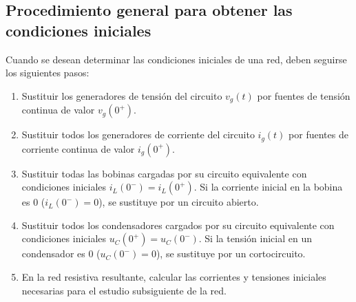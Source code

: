 \documentclass[11pt]{book} %
\begin{document}
	
	\subsection{Procedimiento general para obtener las condiciones iniciales} \label{sec.proc_general_ci}
	Cuando se desean determinar las condiciones iniciales de una red, deben seguirse los siguientes pasos:
	\begin{enumerate}
		\item Sustituir los generadores de tensión del circuito $v_g(t)$ por fuentes de tensión continua de valor $v_g(0^+)$.
		\item Sustituir todos los generadores de corriente del circuito $i_g(t)$ por fuentes de corriente continua de valor $i_g(0^+)$.
		\item Sustituir todas las bobinas cargadas por su circuito equivalente con condiciones iniciales $i_L(0^-)=i_L(0^+)$. Si la corriente inicial en la bobina es 0 ($i_L(0^-)=0$), se sustituye por un circuito abierto.
		\item Sustituir todos los condensadores cargados por su circuito equivalente con condiciones iniciales $u_C(0^+)=u_C(0^-)$. Si la tensión inicial en un condensador es 0 ($u_C(0^-)=0$), se sustituye por un cortocircuito.
		\item En la red resistiva resultante, calcular las corrientes y tensiones iniciales necesarias para el estudio subsiguiente de la red.
	\end{enumerate}
	
\end{document}
